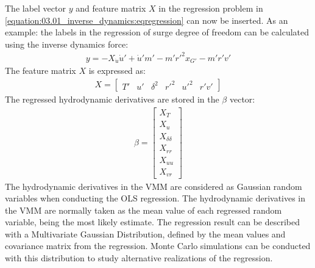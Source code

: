 \documentclass[review]{elsarticle}
\begin{document}
\sphinxAtStartPar
The label vector \(y\) and feature matrix \(X\) in the regression problem in \autoref{equation:03.01_inverse_dynamics:eqregression} can now be inserted. As an example: the labels in the regression of surge degree of freedom can be calculated using the inverse dynamics force:
\begin{equation}\label{equation:03.01_inverse_dynamics:diff_eq_X_y}
\begin{split}\displaystyle y = - X_{\dot{u}} \dot{u}' + \dot{u}' m' - m' r'^{2} x_{G'} - m' r' v'\end{split}
\end{equation}
\sphinxAtStartPar
The feature matrix \(X\) is expressed as:
\begin{equation}\label{equation:03.01_inverse_dynamics:diff_eq_X_X}
\begin{split}\displaystyle X = \left[\begin{matrix}T' & u' & \delta^{2} & r'^{2} & u'^{2} & r' v'\end{matrix}\right]\end{split}
\end{equation}
\sphinxAtStartPar
The regressed hydrodynamic derivatives are stored in the \(\beta\) vector:
\begin{equation}\label{equation:03.01_inverse_dynamics:diff_eq_X_beta}
\begin{split}\displaystyle \beta = \left[\begin{matrix}X_{T}\\X_{u}\\X_{\delta\delta}\\X_{rr}\\X_{uu}\\X_{vr}\end{matrix}\right]\end{split}
\end{equation}
\sphinxAtStartPar
The hydrodynamic derivatives in the VMM are considered as Gaussian random variables when conducting the OLS regression. The hydrodynamic derivatives in the VMM are normally taken as the mean value of each regressed random variable, being the most likely estimate. The regression result can be described with a Multivariate Gaussian Distribution, defined by the mean values and covariance matrix from the regression. Monte Carlo simulations can be conducted with this distribution to study alternative realizations of the regression.
\end{document}
